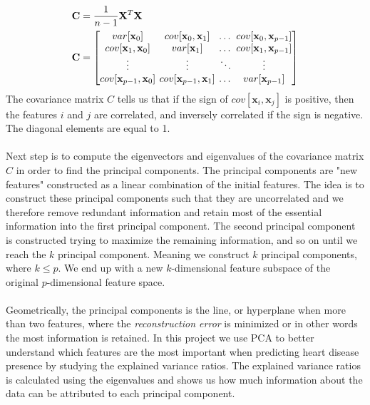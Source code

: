 \documentclass[a4paper,twocolumn]{article}
\newcommand{\X}{\mathbf{X}}
\begin{document}
\begin{align}
    \mathbf{C} &= \frac{1}{n - 1}\X^{T}\X\\
    \mathbf{C} &= \setlength\arraycolsep{2pt}\begin{bmatrix} 
    var[{\mathbf{x}_{0}}] & cov[\mathbf{x}_{0}, \mathbf{x}_{1}] & \dots & cov[\mathbf{x}_{0}, \mathbf{x}_{p-1}]\\
    cov[\mathbf{x}_{1}, \mathbf{x}_{0}] & var[\mathbf{x}_{1}] & \dots & cov[\mathbf{x}_{1}, \mathbf{x}_{p-1}]\\
    \vdots & \vdots & \ddots & \vdots\\
    cov[\mathbf{x}_{p-1}, \mathbf{x}_{0}] & cov[\mathbf{x}_{p-1}, \mathbf{x}_{1}] & \dots & var[{\mathbf{x}_{p-1}}]
    \end{bmatrix}
\end{align}
The covariance matrix $C$ tells us that if the sign of $cov[\mathbf{x}_{i}, \mathbf{x}_{j}]$ is positive, then the features $i$ and $j$ are correlated, and inversely correlated if the sign is negative. The diagonal elements are equal to 1.\\
\\
Next step is to compute the eigenvectors and eigenvalues of the covariance matrix $C$ in order to find the principal components. The principal components are "new features" constructed as a linear combination of the initial features. The idea is to construct these principal components such that they are uncorrelated and we therefore remove redundant information and retain most of the essential information into the first principal component. The second principal component is constructed trying to maximize the remaining information, and so on until we reach the $k$ principal component. Meaning we construct $k$ principal components, where $k \leq p$. We end up with a new $k$-dimensional feature subspace of the original $p$-dimensional feature space.\\
\\
Geometrically, the principal components is the line, or hyperplane when more than two features, where the \textit{reconstruction error} is minimized\cite{hastie} or in other words the most information is retained. In this project we use PCA to better understand which features are the most important when predicting heart disease presence by studying the explained variance ratios. The explained variance ratios is calculated using the eigenvalues and shows us how much information about the data can be attributed to each principal component.\\
\end{document}
